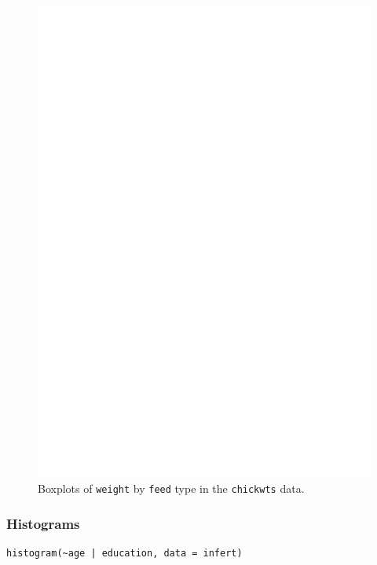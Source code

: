 \documentclass[captions=tableheading]{scrbook}
\begin{document}
\begin{figure}[th]
  \includegraphics[angle=270, totalheight=4in]{ps/bwplot.ps}
  \caption{Boxplots of \texttt{weight} by \texttt{feed} type in the \texttt{chickwts} data.}
  \label{fig:bwplot}
\end{figure}
\subsubsection{Histograms}
\label{sec-2-6-3-2}



\begin{verbatim}
histogram(~age | education, data = infert)
\end{verbatim}
\end{document}
